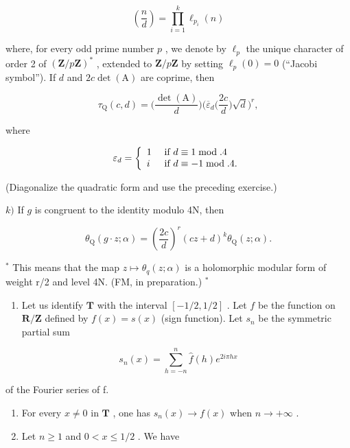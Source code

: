 \[
\left(\frac {n}{d}\right) = \prod_ {i = 1} ^ {k} \ell_ {p _ {i}} (n)
\]

where, for every odd prime number \(p\) , we denote by \(\ell_p\) the unique character of order 2 of \((\mathbf{Z}/p\mathbf{Z})^*\) , extended to \(\mathbf{Z}/p\mathbf{Z}\) by setting \(\ell_p(0) = 0\) (“Jacobi symbol”). If \(d\) and \(2c\det(\mathrm{A})\) are coprime, then

\[
\tau_ {\mathrm{Q}} (c, d) = \Big (\frac {\det (\mathrm{A})}{d} \Big) \Big (\overline {{\varepsilon}} _ {d} \Big (\frac {2 c}{d} \Big) \sqrt {d} \Big) ^ {r},
\]

where

\[
\varepsilon_ {d} = \left\{ \begin{array}{l l} 1 & \text { if } d \equiv 1 \bmod . 4 \\ i & \text { if } d \equiv - 1 \bmod . 4. \end{array} \right.
\]

(Diagonalize the quadratic form and use the preceding exercise.)

\(k)\) If \(g\) is congruent to the identity modulo 4N, then

\[
\theta_ {\mathrm{Q}} (g \cdot z; \alpha) = \left(\frac {2 c}{d}\right) ^ {r} (c z + d) ^ {k} \theta_ {\mathrm{Q}} (z; \alpha).
\]

\(^{*}\) This means that the map \(z \mapsto \theta_{q}(z; \alpha)\) is a holomorphic modular form of weight r/2 and level 4N. (FM, in preparation.) \(^{*}\)

\begin{enumerate}
\def\labelenumi{\arabic{enumi})}
\setcounter{enumi}{61}
\tightlist
\item
  Let us identify \(\mathbf{T}\) with the interval \([-1/2, 1/2]\) . Let \(f\) be the function on \(\mathbf{R}/\mathbf{Z}\) defined by \(f(x) = s(x)\) (sign function). Let \(s_n\) be the symmetric partial sum
\end{enumerate}

\[
s _ {n} (x) = \sum_ {h = - n} ^ {n} \widehat {f} (h) e ^ {2 i \pi h x}
\]

of the Fourier series of f.

\begin{enumerate}
\def\labelenumi{\alph{enumi})}
\item
  For every \(x \neq 0\) in \(\mathbf{T}\) , one has \(s_n(x) \to f(x)\) when \(n \to +\infty\) .
\item
  Let \(n \geqslant 1\) and \(0 < x \leqslant 1/2\) . We have
\end{enumerate}

